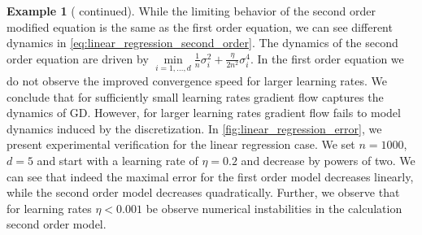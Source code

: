 \documentclass[12pt]{article}
\theoremstyle{definition}
\newtheorem{example}[example]{Example}
\numberwithin{equation}{section}
\newcommand{\T}{\mathsf{T}}
\newcommand{\norm}[1]{\lVert{#1}\rVert_2}
\newcommand{\defeq}{\vcentcolon=}
\DeclareMathOperator{\diag}{diag}
\begin{document}
\begin{example}[ continued]
  While the limiting behavior of the second order modified equation is the same as the first order equation, we can see different dynamics in \eqref{eq:linear_regression_second_order}. The dynamics of the second order equation are driven by $\min\limits_{i=1,\dots,d}\frac{1}{n}\sigma_i^2 + \frac{\eta}{2n^2}\sigma_i^4$. In the first order equation we do not observe the improved convergence speed for larger learning rates.
  We conclude that for sufficiently small learning rates gradient flow captures the dynamics of GD. However, for larger learning rates gradient flow fails to model dynamics induced by the discretization. In \autoref{fig:linear_regression_error}, we present experimental verification for the linear regression case. We set $n = 1000$, $d = 5$ and start with a learning rate of $\eta = 0.2$ and decrease by powers of two. We can see that indeed the maximal error for the first order model decreases linearly, while the second order model decreases quadratically. Further, we observe that for learning rates $\eta < 0.001$ be observe numerical instabilities in the calculation second order model.


\end{example}
\end{document}
